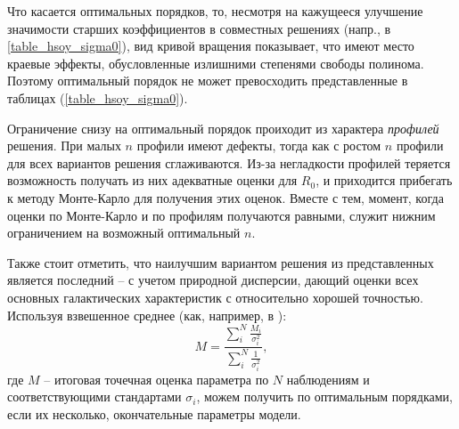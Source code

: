\documentclass{matmex-diploma-custom}
\begin{document}
\par Что касается оптимальных порядков, то, несмотря на кажущееся улучшение значимости старших коэффициентов в совместных решениях (напр., в \ref{table_hsoy_sigma0}), вид кривой вращения показывает, что имеют место краевые эффекты, обусловленные излишними степенями свободы полинома.  Поэтому оптимальный порядок не может превосходить представленные в таблицах (\ref{table_hsoy_sigma0}). 
\par Ограничение снизу на оптимальный порядок проиходит из характера \textit{профилей} решения. При малых $n$ профили имеют дефекты, тогда как с ростом $n$ профили для всех вариантов решения сглаживаются. Из-за негладкости профилей теряется возможность получать из них адекватные оценки для $R_0$, и приходится прибегать к методу Монте-Карло для получения этих оценок. Вместе с тем, момент, когда оценки по Монте-Карло и по профилям получаются равными, служит нижним ограничением на возможный оптимальный $n$.
\par Также стоит отметить, что наилучшим вариантом решения из представленных является последний -- с учетом природной дисперсии, дающий оценки всех основных галактических характеристик с относительно хорошей точностью. Используя взвешенное среднее (как, например, в \cite{Camarillo}):
\begin{equation}
        M = \frac{\sum_i^N \frac{M_i}{\sigma_i^2}}{\sum_i^N \frac{1}{\sigma_i^2}},
\end{equation}
где $M$ -- итоговая точечная оценка параметра по $N$ наблюдениям и соответствующими стандартами $\sigma_i$, можем получить по оптимальным порядками, если их несколько, окончательные параметры модели.
\pagebreak
\end{document}
